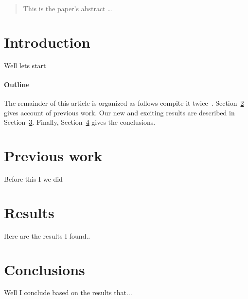 \documentclass[12pt]{article}
\begin{document}
\maketitle

\begin{abstract}
This is the paper's abstract \ldots
\end{abstract}

\section{Introduction}
Well lets start 

\paragraph{Outline}
The remainder of this article is organized as follows compite it twice~\cite{JA:01}.
Section~\ref{previous work} gives account of previous work.
Our new and exciting results are described in Section~\ref{results}.
Finally, Section~\ref{conclusions} gives the conclusions.

\section{Previous work}\label{previous work}
Before this I we did

\section{Results}\label{results}
Here are the results I found..

\section{Conclusions}\label{conclusions}
Well I conclude based on the results that...




\end{document}
